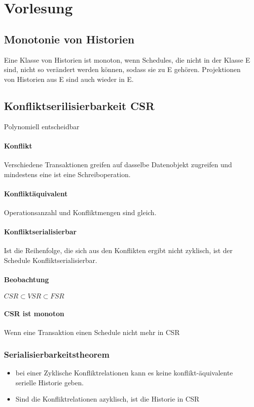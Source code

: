 \documentclass[ngerman]{scrartcl}
\begin{document}
\section{Vorlesung}
\subsection{Monotonie von Historien}
Eine Klasse von Historien ist monoton, wenn Schedules, die nicht in der Klasse E sind, nicht so verändert werden können, sodass sie zu E gehören. Projektionen von Historien aus E sind auch wieder in E.

\subsection{Konfliktserilisierbarkeit CSR}
Polynomiell entscheidbar
\paragraph{Konflikt} Verschiedene Transaktionen greifen auf dasselbe Datenobjekt zugreifen und mindestens eine ist eine Schreiboperation.
\paragraph{Konfliktäquivalent} Operationsanzahl und Konfliktmengen sind gleich.  
\paragraph{Konfliktserialisierbar} Ist die Reihenfolge, die sich aus den Konflikten ergibt nicht zyklisch, ist der Schedule Konfliktserialisierbar. 
\paragraph{Beobachtung} $ CSR \subset VSR \subset FSR $
\paragraph{CSR ist monoton} Wenn eine Transaktion einen Schedule nicht mehr in CSR

\subsubsection{Serialisierbarkeitstheorem}
\begin{itemize}
  \item bei einer Zyklische Konfliktrelationen kann es keine konflikt-äquivalente serielle Historie geben.
  \item Sind die Konfliktrelationen azyklisch, ist die Historie in CSR
\end{itemize}
\end{document}

